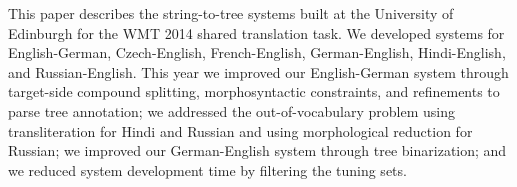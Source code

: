 This paper describes the string-to-tree systems built at the University of Edinburgh for the WMT 2014 shared translation task.  We developed systems for English-German, Czech-English, French-English, German-English, Hindi-English, and Russian-English.  This year we improved our English-German system through target-side compound splitting, morphosyntactic constraints, and refinements to parse tree annotation; we addressed the out-of-vocabulary problem using transliteration for Hindi and Russian and using morphological reduction for Russian; we improved our German-English system through tree binarization; and we reduced system development time by filtering the tuning sets.
